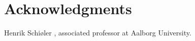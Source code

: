 \section{Acknowledgments}\label{sec:acknowledgements}
Henrik Schiøler , associated professor at Aalborg University. \\
